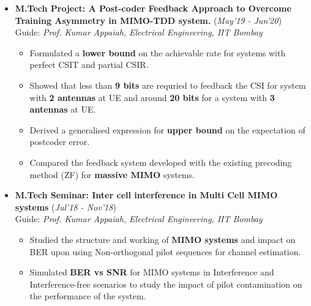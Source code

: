 \documentclass[10pt]{article}
\begin{document}
\begin{itemize}[leftmargin=0.4cm]


\item \textbf{M.Tech Project:  A Post-coder Feedback Approach to Overcome Training Asymmetry in MIMO-TDD system.}
\hfill{(\textit{May'19 - Jun'20})} \\
Guide: \textit{Prof. Kumar Appaiah, Electrical Engineering, IIT Bombay}


\begin{itemize}

\item Formulated a \textbf{lower bound} on the achievable rate for systems with perfect CSIT and partial CSIR.

\item Showed that less than \textbf{9 bits} are requried to feedback the CSI for system with \textbf{ 2 antennas} at UE and around\textbf{ 20 bits} for a system with \textbf{3 antennas} at UE.  

\item Derived a generalised expression for \textbf{upper bound} on the expectation of postcoder error. 

\item Compared the feedback system developed with the existing precoding method (ZF) for \textbf{massive MIMO} systems.

\end{itemize}


\item \textbf{M.Tech Seminar: Inter cell interference in Multi Cell MIMO systems 
} 
\hfill{(\textit{Jul'18 - Nov'18})}\\
Guide: \textit{Prof. Kumar Appaiah, Electrical Engineering, IIT Bombay}
	\begin{itemize}
	\item Studied the structure and working of \textbf{MIMO systems} and impact on BER upon using Non-orthogonal pilot sequences for channel estimation.
	\item Simulated \textbf{BER vs SNR} for MIMO systems in Interference and Interference-free scenarios to study the impact of pilot contamination on the performance of the system.

	\end{itemize}
	

\end{itemize}
\hspace{-0.25cm}
\colorbox{bl}{}
\end{document}
